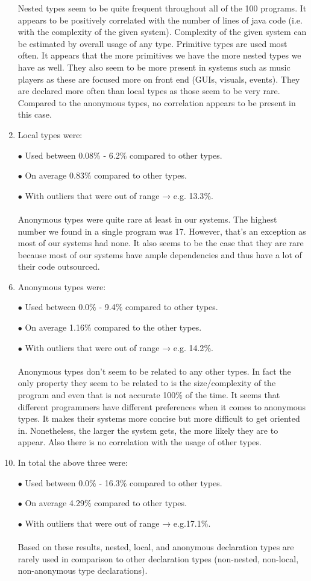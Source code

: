 \documentclass{assignment}
\begin{document}
\begin{enumerate}
	Nested types seem to be quite frequent throughout all of the 100 programs. It appears to be positively correlated with the number of lines of java code (i.e. with the complexity of the given system). Complexity of the given system can be estimated by overall usage of any type. Primitive types are used most often. It appears that the more primitives we have the more nested types we have as well. They also seem to be more present in systems such as music players as these are focused more on front end (GUIs, visuals, events). They are declared more often than local types as those seem to be very rare. Compared to the anonymous types, no correlation appears to be present in this case. \\
\item Local types were:
\item[$\bullet$]Used between 0.08$\%$ - 6.2$\%$ compared to other types.
\item[$\bullet$]On average 0.83$\%$ compared to other types.
\item[$\bullet$]With outliers that were out of range → e.g. 13.3$\%$.\\
\\Anonymous types were quite rare at least in our systems. The highest number we found in a single program was 17. However, that’s an exception as most of our systems had none. It also seems to be the case that they are rare because most of our systems have ample dependencies and thus have a lot of their code outsourced.\\
\item Anonymous types were:
\item[$\bullet$]Used between 0.0$\%$ - 9.4$\%$ compared to other types.
\item[$\bullet$]On average 1.16$\%$ compared to the other types.
\item[$\bullet$]With outliers that were out of range → e.g. 14.2$\%$.\\
\\Anonymous types don’t seem to be related to any other types. In fact the only property they seem to be related to is the size/complexity of the program and even that is not accurate 100$\%$ of the time. It seems that different programmers have different preferences when it comes to anonymous types. It makes their systems more concise but more difficult to get oriented in. Nonetheless, the larger the system gets, the more likely they are to appear. Also there is no correlation with the usage of other types.\\
\item In total the above three were:
\item[$\bullet$]Used between 0.0$\%$ - 16.3$\%$ compared to other types.
\item[$\bullet$]On average 4.29$\%$ compared to other types.
\item[$\bullet$]With outliers that were out of range → e.g.17.1$\%$.\\
\\Based on these results, nested, local, and anonymous declaration types are rarely  used in comparison to other declaration types (non-nested, non-local, non-anonymous type declarations).\\
\end{enumerate}
\end{document}
